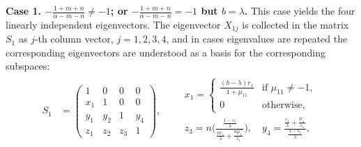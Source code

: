 \documentclass[a4paper,11pt]{article}
\begin{document}
{\bf Case 1. $-\frac{1+m+n}{\alpha-m-n}\ne -1$; or $-\frac{1+m+n}{\alpha-m-n}= -1$ but $b=\lambda$. } This case yields the four linearly independent eigenvectors. The eigenvector $X_{1j}$ is collected in the matrix $S_1$ as $j$-th column vector, $j=1,2,3,4$, and in cases eigenvalues are repeated the corresponding eigenvectors are understood as a basis for the corresponding subspaces:
\begin{align*}
 S_1&=
 \begin{pmatrix}
    1 & 0 & 0 & 0\\
    x_1 & 1 & 0 & 0\\
    y_1 & y_2 & 1 & y_4\\
    z_1 & z_2 & z_3 &1
 \end{pmatrix}, \quad \quad 
 \begin{array}{l}
  x_1= 
 \begin{cases} 
  \frac{(b-\lambda)r_1}{1+\mu_{11}} & \text{if $\mu_{11}\ne -1$,}\\
  0 & \text{otherwise,}
 \end{cases}\\
 z_3=n\bigg(\frac{\frac{1-s_1}{\lambda}}{\frac{n r_1}{\lambda} + \frac{n\mu_{1}^+}{s_1}}\bigg), \quad y_4=\frac{\frac{r_1}{\lambda}+\frac{\mu_1^-}{s_1}}{\frac{1-s_1}{\lambda}},\\
 \end{array}
\end{align*}
\end{document}
